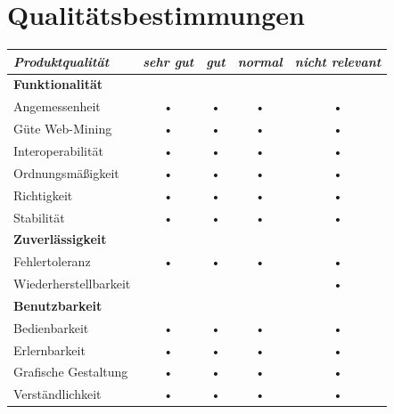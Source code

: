 \documentclass[10pt]{scrreprt}
\begin{document}
\chapter{Qualitätsbestimmungen}
\begin{center}
\begin{tabular}{lcccc}
\hline 
\rule[-1ex]{0pt}{4ex} \textit{Produktqualität} & \textit{sehr gut} & \textit{gut} & \textit{normal} & \textit{nicht relevant} \\ 
\hline 
\rule[-1ex]{0pt}{4ex} \textbf{Funktionalität} &  &  &  &  \\ 
\rule[-1ex]{0pt}{4ex} \hspace{10pt} Angemessenheit & • & • & • & • \\ 
\rule[-1ex]{0pt}{4ex} \hspace{10pt} Güte Web-Mining & • & • & • & • \\ 
\rule[-1ex]{0pt}{4ex} \hspace{10pt} Interoperabilität & • & • & • & • \\ 
\rule[-1ex]{0pt}{4ex} \hspace{10pt} Ordnungsmäßigkeit & • & • & • & • \\ 
\rule[-1ex]{0pt}{4ex} \hspace{10pt} Richtigkeit & • & • & • & • \\ 
\rule[-1ex]{0pt}{4ex} \hspace{10pt} Stabilität & • & • & • & • \\ 

\hline 
\rule[-1ex]{0pt}{4ex} \textbf{Zuverlässigkeit} &  &  &  &  \\ 
\rule[-1ex]{0pt}{4ex} \hspace{10pt} Fehlertoleranz & • & • & • & • \\ 
\rule[-1ex]{0pt}{4ex} \hspace{10pt} Wiederherstellbarkeit &  &  &  & • \\ 

\hline 
\rule[-1ex]{0pt}{4ex} \textbf{Benutzbarkeit} &  &  &  &  \\ 
\rule[-1ex]{0pt}{4ex} \hspace{10pt} Bedienbarkeit & • & • & • & • \\ 
\rule[-1ex]{0pt}{4ex} \hspace{10pt} Erlernbarkeit & • & • & • & • \\ 
\rule[-1ex]{0pt}{4ex} \hspace{10pt} Grafische Gestaltung & • & • & • & • \\ 
\rule[-1ex]{0pt}{4ex} \hspace{10pt} Verständlichkeit & • & • & • & • \\ 


\end{tabular}
\end{center}
\end{document}

